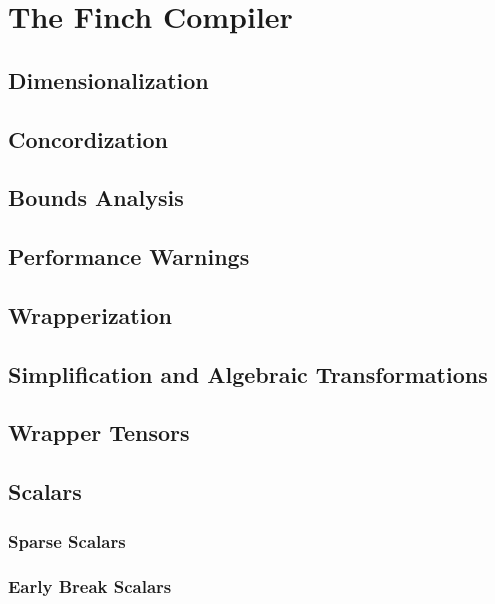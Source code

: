 \section{The Finch Compiler}

\subsection{Dimensionalization}

\subsection{Concordization}

\subsection{Bounds Analysis}

\subsection{Performance Warnings}

\subsection{Wrapperization}

\subsection{Simplification and Algebraic Transformations}

\subsection{Wrapper Tensors}

\subsection{Scalars}

\subsubsection{Sparse Scalars}
\subsubsection{Early Break Scalars}